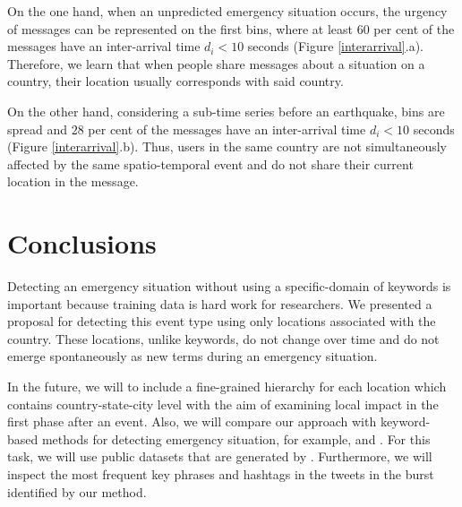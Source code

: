 \documentclass{ewic}
\begin{document}
On the one hand, when an unpredicted emergency situation occurs, the urgency of messages can be represented on the first bins, where at least $60$ per cent of the messages have an inter-arrival time $d_{i} < 10$ seconds (Figure \ref{interarrival}.a). Therefore, we learn that when people share messages about a situation on a country, their location usually corresponds with said country.

On the other hand, considering a sub-time series before an earthquake, bins are spread and $28$ per cent of the messages have an inter-arrival time $d_{i} < 10$ seconds (Figure \ref{interarrival}.b). Thus, users in the same country are not simultaneously affected by the same spatio-temporal event and do not share their current location in the message.
\section{Conclusions}
Detecting an emergency situation without using a specific-domain of keywords is important because training data is hard work for researchers. We presented a proposal for detecting this event type using only locations associated with the country. These locations, unlike keywords, do not change over time and do not emerge spontaneously as new terms during an emergency situation.

In the future, we will to include a fine-grained hierarchy for each location which contains country-state-city level with the aim of examining local impact in the first phase after an event. Also, we will compare our approach with keyword-based methods for detecting emergency situation, for example, \cite{kumar2011tweettracker} and \cite{cameron2012emergency}. For this task, we will use public datasets that are generated by \cite{imranaidr2014}. Furthermore, we will inspect the most frequent key phrases and hashtags in the tweets in the burst identified by our method.
\end{document}
